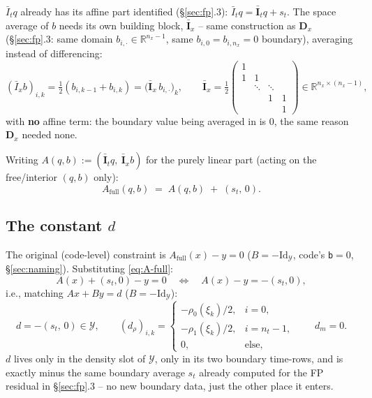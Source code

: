 \documentclass[11pt]{article}
\newcommand{\code}[1]{\texttt{#1}}
\begin{document}
$\bar I_t q$ already has its affine part identified (\S\ref{sec:fp}.3): $\bar I_t q =
\bar{\mathbf I}_t q + s_t$. The space average of $b$ needs its own building block,
$\bar{\mathbf I}_x$ -- same construction as $\mathbf D_x$ (\S\ref{sec:fp}.3: same domain
$b_{i,\cdot}\in\mathbb R^{n_x-1}$, same $b_{i,0}=b_{i,n_x}=0$ boundary), averaging instead
of differencing:
\begin{equation}
  (\bar I_x b)_{i,k} = \tfrac12(b_{i,k-1}+b_{i,k}) = \bigl(\bar{\mathbf I}_x\,b_{i,\cdot}\bigr)_k,
  \qquad
  \bar{\mathbf I}_x = \tfrac12\begin{pmatrix}
    1 & & & \\
    1 & 1 & & \\
     & \ddots & \ddots & \\
     & & 1 & 1 \\
     & & & 1
  \end{pmatrix} \in \mathbb{R}^{n_x\times(n_x-1)},
\end{equation}
with \textbf{no} affine term: the boundary value being averaged in is $0$, the same
reason $\mathbf D_x$ needed none.

Writing $A(q,b):=(\bar{\mathbf I}_t q,\ \bar{\mathbf I}_x b)$ for the purely linear part
(acting on the free/interior $(q,b)$ only):
\begin{equation}
  \label{eq:A-full}
  A_{\mathrm{full}}(q,b) \;=\; A(q,b) \;+\; (s_t,\,0).
\end{equation}

\subsection{The constant $d$}

The original (code-level) constraint is $A_{\mathrm{full}}(x)-y=0$ ($B=-\mathrm{Id}_
\mathcal{Y}$, code's \code{b}$=0$, \S\ref{sec:naming}). Substituting \eqref{eq:A-full}:
\[
  A(x) + (s_t,0) - y = 0 \quad\Longleftrightarrow\quad A(x) - y = -(s_t,0),
\]
i.e., matching $Ax+By=d$ ($B=-\mathrm{Id}_\mathcal{Y}$):
\begin{equation}
  \label{eq:d}
  d = -(s_t,\,0) \in \mathcal Y, \qquad
  (d_\rho)_{i,k} =
  \begin{cases}
    -\rho_0(\xi_k)/2, & i=0,\\
    -\rho_1(\xi_k)/2, & i=n_t-1,\\
    0, & \text{else},
  \end{cases}
  \qquad d_m = 0.
\end{equation}
$d$ lives only in the density slot of $\mathcal Y$, only in its two boundary time-rows,
and is exactly minus the same boundary average $s_t$ already computed for the FP residual
in \S\ref{sec:fp}.3 -- no new boundary data, just the other place it enters.
\end{document}
